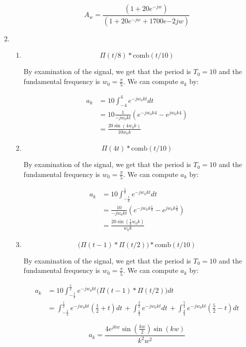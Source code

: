 \documentclass[]{article}
\begin{document}
\begin{enumerate}
\begin{enumerate}
    \[
        \boxed{A_w = \frac{(1 + 20e^{-jw})}{(1 +  20  e^{-jw} + 1700 e{-2jw})}}
    \]
  \end{enumerate}
\item
  \begin{enumerate}
  \def\labelenumii{\alph{enumii}.}
  \item
    \[
        \Pi(t / 8) * \text{comb}(t / 10)
    \]

    By examination of the signal, we get that the period is \(T_0 = 10\)
    and the fundamental frequency is \(\boxed{w_0 = \frac{\pi}{5}}\). We
    can compute \(a_k\) by:

    \begin{align*}
        a_k &= 10\int_{-4}^{4} e^{-jw_0 k t} dt \\
            &= 10 \frac{1}{-jw_0kt} \left(  e^{-jw_0k4}- e^{jw_0k4}\right) \\
            &= \boxed{ \frac{20\sin(4w_0 k)}{10 w_0 k} }
    \end{align*}
  \item
    \[
        \Pi(4t) * \text{comb}(t / 10)
    \]

    By examination of the signal, we get that the period is \(T_0 = 10\)
    and the fundamental frequency is \(\boxed{w_0 = \frac{\pi}{5}}\). We
    can compute \(a_k\) by:

    \begin{align*}
        a_k &= 10 \int_{-\frac{1}{8}}^{\frac{1}{8}} e^{-jw_0 k t} dt \\
            &= \frac{10}{-jw_0kt } \left(
                e^{-jw_0k\frac{1}{8}}- e^{jw_0k\frac{1}{8}}
            \right) \\
        &= \boxed{ \frac{20\sin(\frac{1}{8}w_0 k)}{w_0 k} }
    \end{align*}
  \item
    \[
        \Big( \Pi(t - 1) * \Pi(t / 2) \Big) * \text{comb}(t / 10)
    \]

    By examination of the signal, we get that the period is \(T_0 = 10\)
    and the fundamental frequency is \(\boxed{w_0 = \frac{\pi}{5}}\). We
    can compute \(a_k\) by:

    \begin{align*}
        a_k &= 10 \int_{-\frac{1}{2}}^{\frac{5}{2}} e^{-jw_0 k t} \Big( \Pi(t - 1) * \Pi(t / 2) \Big) dt \\
            &=  \int_{-\frac{1}{2}}^{\frac{1}{2}} e^{-jw_0 k t} \left( \frac{1}{2} + t \right) dt \, +
                \int_{ \frac{1}{2}}^{\frac{3}{2}} e^{-jw_0 k t} dt\, +
                \int_{ \frac{3}{2}}^{\frac{5}{2}} e^{-jw_0 k t} \left( \frac{5}{2} - t \right) dt
    \end{align*}

    \[
        \boxed{a_k = \frac{4 e^{j k w} \sin \left(\frac{k w}{2}\right) \sin (k w)}{k^2 w^2}}
    \]
  \end{enumerate}
\end{enumerate}
\end{document}
